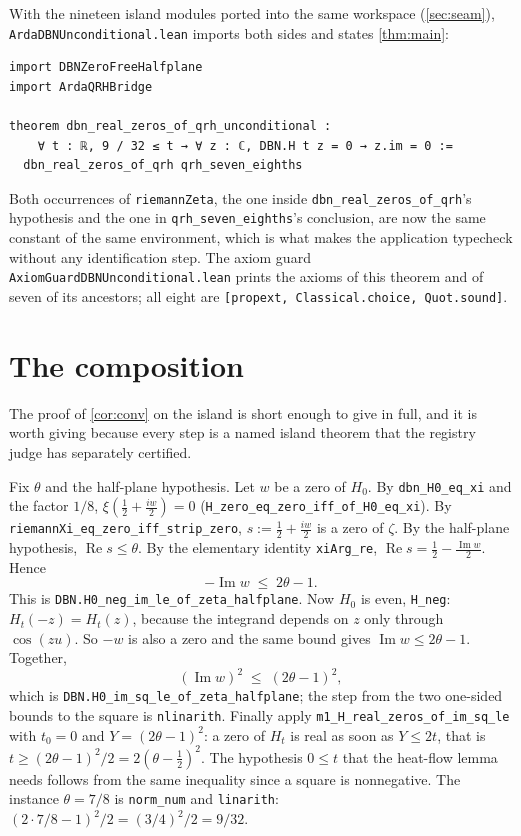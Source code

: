 \documentclass[11pt]{article}
\theoremstyle{definition}
\newcommand{\lean}[1]{\texttt{#1}}
\newcommand{\Hfun}{H}
\newcommand{\re}{\operatorname{Re}}
\newcommand{\im}{\operatorname{Im}}
\begin{document}
With the nineteen island modules ported into the same workspace (\cref{sec:seam}), \lean{ArdaDBNUnconditional.lean} imports both sides and states \cref{thm:main}:
\begin{lstlisting}
import DBNZeroFreeHalfplane
import ArdaQRHBridge

theorem dbn_real_zeros_of_qrh_unconditional :
    ∀ t : ℝ, 9 / 32 ≤ t → ∀ z : ℂ, DBN.H t z = 0 → z.im = 0 :=
  dbn_real_zeros_of_qrh qrh_seven_eighths
\end{lstlisting}
Both occurrences of \lean{riemannZeta}, the one inside \lean{dbn\_real\_zeros\_of\_qrh}'s hypothesis and the one in \lean{qrh\_seven\_eighths}'s conclusion, are now the same constant of the same environment, which is what makes the application typecheck without any identification step. The axiom guard \lean{AxiomGuardDBNUnconditional.lean} prints the axioms of this theorem and of seven of its ancestors; all eight are \lean{[propext, Classical.choice, Quot.sound]}.

\section{The composition}\label{sec:composition}

The proof of \cref{cor:conv} on the island is short enough to give in full, and it is worth giving because every step is a named island theorem that the registry judge has separately certified.

Fix $\theta$ and the half-plane hypothesis. Let $w$ be a zero of $\Hfun_0$. By \lean{dbn\_H0\_eq\_xi} and the factor $1/8$, $\xi(\tfrac12 + \tfrac{iw}{2}) = 0$ (\lean{H\_zero\_eq\_zero\_iff\_of\_H0\_eq\_xi}). By \lean{riemannXi\_eq\_zero\_iff\_strip\_zero}, $s := \tfrac12 + \tfrac{iw}{2}$ is a zero of $\zeta$. By the half-plane hypothesis, $\re s \le \theta$. By the elementary identity \lean{xiArg\_re}, $\re s = \tfrac12 - \tfrac{\im w}{2}$. Hence
\[
-\im w \;\le\; 2\theta - 1 .
\]
This is \lean{DBN.H0\_neg\_im\_le\_of\_zeta\_halfplane}. Now $\Hfun_0$ is even, \lean{H\_neg}: $\Hfun_t(-z) = \Hfun_t(z)$, because the integrand depends on $z$ only through $\cos(zu)$. So $-w$ is also a zero and the same bound gives $\im w \le 2\theta - 1$. Together,
\[
(\im w)^2 \;\le\; (2\theta - 1)^2 ,
\]
which is \lean{DBN.H0\_im\_sq\_le\_of\_zeta\_halfplane}; the step from the two one-sided bounds to the square is \lean{nlinarith}. Finally apply \lean{m1\_H\_real\_zeros\_of\_im\_sq\_le} with $t_0 = 0$ and $Y = (2\theta-1)^2$: a zero of $\Hfun_t$ is real as soon as $Y \le 2t$, that is $t \ge (2\theta - 1)^2/2 = 2(\theta - \tfrac12)^2$. The hypothesis $0 \le t$ that the heat-flow lemma needs follows from the same inequality since a square is nonnegative. The instance $\theta = 7/8$ is \lean{norm\_num} and \lean{linarith}: $(2 \cdot 7/8 - 1)^2/2 = (3/4)^2/2 = 9/32$.
\end{document}
